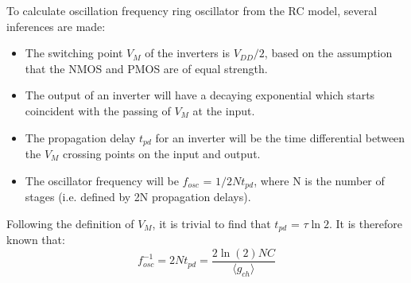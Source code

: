 \documentclass[10pt,a4paper]{article}
\begin{document}
	To calculate oscillation frequency ring oscillator from the RC model, several inferences are made:
	\begin{itemize}
		\item The switching point $V_M$ of the inverters is $V_{DD}/2$, based on the assumption that the NMOS and PMOS are of equal strength.
		\item The output of an inverter will have a decaying exponential which starts coincident with the passing of $V_M$ at the input.
		\item The propagation delay $t_{pd}$ for an inverter will be the time differential between the $V_M$ crossing points on the input and output.
		\item The oscillator frequency will be $f_{osc}$ = $1/2Nt_{pd}$, where N is the number of stages (i.e. defined by 2N propagation delays).
	\end{itemize}
	Following the definition of $V_M$, it is trivial to find that $t_{pd}$ = $\tau\ln2$. It is therefore known that:
	\begin{equation}
	f_{osc}^{-1} = 2Nt_{pd} = \frac{2\ln(2)NC}{\langle g_{ch}\rangle}
	\end{equation}
\end{document}
